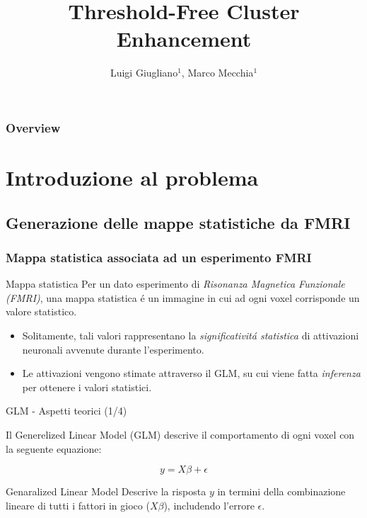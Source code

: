 \documentclass{beamer}
\title{Threshold-Free Cluster Enhancement}
\author{Luigi Giugliano$^1$, Marco Mecchia$^1$}
\institute{$^1$Università degli studi di Salerno}
\begin{document}
\begin{frame}
   \maketitle
\end{frame}

\begin{frame}
  \frametitle{Overview}
  \footnotesize \tableofcontents
\end{frame}


\section{Introduzione al problema}

\subsection{Generazione delle mappe statistiche da FMRI}

\begin{frame}
\frametitle{Mappa statistica associata ad un esperimento FMRI}
\begin{block}{Mappa statistica}
Per un dato esperimento di \emph{Risonanza Magnetica Funzionale (FMRI)}, una \alert{mappa statistica} \'e un immagine in cui ad ogni voxel corrisponde un valore statistico.
\end{block}
\begin{itemize}
\item Solitamente, tali valori rappresentano la \emph{significativit\'a statistica} di attivazioni neuronali avvenute durante l'esperimento.
\item Le attivazioni vengono stimate attraverso il \alert{GLM}, su cui viene fatta \emph{inferenza} per ottenere i valori statistici.
\end{itemize}
\end{frame}
\begin{frame}{GLM - Aspetti teorici (1/4)}

Il \alert{Generelized Linear Model (GLM)} descrive il comportamento di ogni voxel con la seguente equazione:

$$y = X\beta + \epsilon$$ 

\begin{block}{Genaralized Linear Model}
Descrive la risposta $y$ in termini della combinazione lineare di tutti i fattori in gioco ($X\beta$), includendo l'errore $\epsilon$.
\end{block}

\end{frame}
\end{document}
